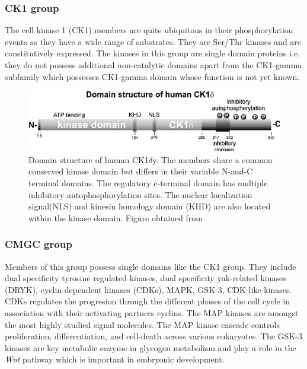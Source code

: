 \documentclass[a4paper, 11pt]{report}
\begin{document}
\subsubsection{CK1 group}
The cell kinase 1 (CK1) members are quite ubiquitous in their phosphorylation events as they have a wide range of substrates. They are Ser/Thr kinases and are constitutively expressed. The kinases in this group are single domain proteins i.e. they do not possess additional non-catalytic domains apart from the CK1-gamma subfamily which possesses CK1-gamma domain whose function is not yet known.\\
\begin{figure}[H]
	\includegraphics[width=.8\linewidth]{figures/ck.jpg}
	\centering
	\caption{Domain structure of human CK1$\delta$y. The members share a common conserved kinase domain but differs in their variable N-and-C terminal domains. The regulatory c-terminal domain has multiple inhibitory autophosphorylation sites. The nuclear localization signal(NLS) and kinesin homology domain (KHD) are also located within the kinase domain. Figure obtained from \cite{knippschild2005role}}
	\label{camk_kinase}
\end{figure}
\subsubsection{CMGC group}
Members of this group possess single domains like the CK1 group. They include dual specificity tyrosine regulated kinases, dual specificity yak-related kinases (DRYK), cyclin-dependent kinases (CDKs), MAPK, GSK-3, CDK-like kinases. CDKs regulates the progresion through the different phases of the cell cycle in association with their activating partners cyclins. The MAP kinases are amongst the most highly studied signal molecules. The MAP kinase cascade controls proliferation, differentiation, and cell-death across various eukaryotes. The GSK-3 kinases are key metabolic enzyme in glycogen metabolism and play a role in the \textit{Wnt} pathway which is important in embryonic development. \\
\end{document}
